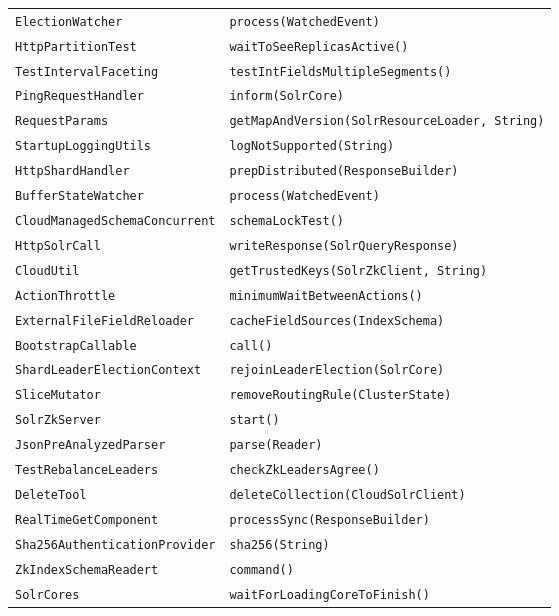 \begin{center}
\begin{longtable}{ll}
\lstinline/ElectionWatcher/&{\lstinline/process(WatchedEvent)/}\\
\lstinline/HttpPartitionTest/&{\lstinline/waitToSeeReplicasActive()/}\\
\lstinline/TestIntervalFaceting/&{\lstinline/testIntFieldsMultipleSegments()/}\\
\lstinline/PingRequestHandler/&{\lstinline/inform(SolrCore)/}\\
\lstinline/RequestParams/&{\lstinline/getMapAndVersion(SolrResourceLoader, String)/}\\
\lstinline/StartupLoggingUtils/&{\lstinline/logNotSupported(String)/}\\
\lstinline/HttpShardHandler/&{\lstinline/prepDistributed(ResponseBuilder)/}\\
\lstinline/BufferStateWatcher/&{\lstinline/process(WatchedEvent)/}\\
\lstinline/CloudManagedSchemaConcurrent/&{\lstinline/schemaLockTest()/}\\
\lstinline/HttpSolrCall/&{\lstinline/writeResponse(SolrQueryResponse)/}\\
\lstinline/CloudUtil/&{\lstinline/getTrustedKeys(SolrZkClient, String)/}\\
\lstinline/ActionThrottle/&{\lstinline/minimumWaitBetweenActions()/}\\
\lstinline/ExternalFileFieldReloader/&{\lstinline/cacheFieldSources(IndexSchema)/}\\
\lstinline/BootstrapCallable/&{\lstinline/call()/}\\
\lstinline/ShardLeaderElectionContext/&{\lstinline/rejoinLeaderElection(SolrCore)/}\\
\lstinline/SliceMutator/&{\lstinline/removeRoutingRule(ClusterState)/}\\
\lstinline/SolrZkServer/&{\lstinline/start()/}\\
\lstinline/JsonPreAnalyzedParser/&{\lstinline/parse(Reader)/}\\
\lstinline/TestRebalanceLeaders/&{\lstinline/checkZkLeadersAgree()/}\\
\lstinline/DeleteTool/&{\lstinline/deleteCollection(CloudSolrClient)/}\\
\lstinline/RealTimeGetComponent/&{\lstinline/processSync(ResponseBuilder)/}\\
\lstinline/Sha256AuthenticationProvider/&{\lstinline/sha256(String)/}\\
\lstinline/ZkIndexSchemaReadert/&{\lstinline/command()/}\\
\lstinline/SolrCores/&{\lstinline/waitForLoadingCoreToFinish()/}\\

\end{longtable}
\end{center}
